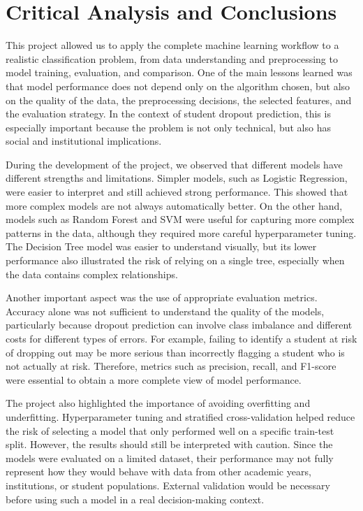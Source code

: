 \documentclass[lettersize,journal]{IEEEtran}
\begin{document}
\section{Critical Analysis and Conclusions}
This project allowed us to apply the complete machine learning workflow to a realistic classification problem, from data understanding and preprocessing to model training, evaluation, and comparison. One of the main lessons learned was that model performance does not depend only on the algorithm chosen, but also on the quality of the data, the preprocessing decisions, the selected features, and the evaluation strategy. In the context of student dropout prediction, this is especially important because the problem is not only technical, but also has social and institutional implications.

During the development of the project, we observed that different models have different strengths and limitations. Simpler models, such as Logistic Regression, were easier to interpret and still achieved strong performance. This showed that more complex models are not always automatically better. On the other hand, models such as Random Forest and SVM were useful for capturing more complex patterns in the data, although they required more careful hyperparameter tuning. The Decision Tree model was easier to understand visually, but its lower performance also illustrated the risk of relying on a single tree, especially when the data contains complex relationships.

Another important aspect was the use of appropriate evaluation metrics. Accuracy alone was not sufficient to understand the quality of the models, particularly because dropout prediction can involve class imbalance and different costs for different types of errors. For example, failing to identify a student at risk of dropping out may be more serious than incorrectly flagging a student who is not actually at risk. Therefore, metrics such as precision, recall, and F1-score were essential to obtain a more complete view of model performance.

The project also highlighted the importance of avoiding overfitting and underfitting. Hyperparameter tuning and stratified cross-validation helped reduce the risk of selecting a model that only performed well on a specific train-test split. However, the results should still be interpreted with caution. Since the models were evaluated on a limited dataset, their performance may not fully represent how they would behave with data from other academic years, institutions, or student populations. External validation would be necessary before using such a model in a real decision-making context.
\end{document}

